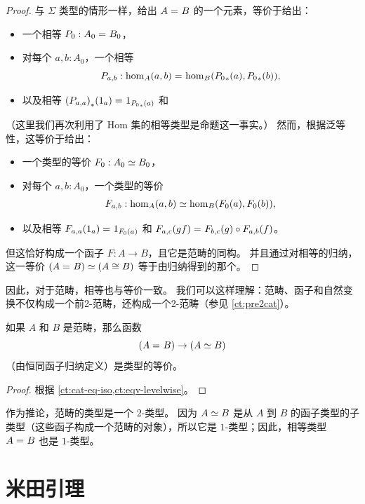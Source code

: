 \begin{proof}
  与 $\Sigma$ 类型的情形一样，给出 $A =_{} B$ 的一个元素，等价于给出：
  \begin{itemize}
  \item 一个相等 $P_0:A_0 =_{} B_0$，
  \item 对每个 $a,b:A_0$，一个相等
    \[P_{a,b}:\hom_A(a,b) =_{} \hom_B({P_0}_{*}\mathopen{}\left({a}\right)\mathclose{},{P_0}_{*}\mathopen{}\left({b}\right)\mathclose{}),\]
  \item 以及相等 ${(P_{a,a})}_{*}\mathopen{}\left({1_a}\right)\mathclose{} =_{} 1_{{P_0}_{*}\mathopen{}\left({a}\right)\mathclose{}}$ 和
  \end{itemize}
  （这里我们再次利用了 Hom 集的相等类型是命题这一事实。）
  然而，根据泛等性，这等价于给出：
  \begin{itemize}
  \item 一个类型的等价 $F_0:A_0 \simeq B_0$，
  \item 对每个 $a,b:A_0$，一个类型的等价
    \[F_{a,b}:\hom_A(a,b) \simeq \hom_B(F_0 (a),F_0 (b)),\]
  \item 以及相等 $F_{a,a}(1_a) =_{} 1_{F_0 (a)}$ 和 $F_{a,c}(gf) =_{} F_{b,c} (g)\circ F_{a,b} (f)$。
  \end{itemize}
  但这恰好构成一个函子 $F:A\to B$，且它是范畴的同构。
  并且通过对相等的归纳，这一等价 $(A =_{} B) \simeq (A\cong B)$ 等于由归纳得到的那个。
\end{proof}

因此，对于范畴，相等也与等价一致。
我们可以这样理解：范畴、函子和自然变换不仅构成一个前2-范畴，还构成一个2-范畴（参见 \cref{ct:pre2cat}）。

\begin{thm}\label{ct:cat-2cat}
  如果 $A$ 和 $B$ 是范畴，那么函数
  \[(A =_{} B) \to (A \simeq B)\]
  （由恒同函子归纳定义）是类型的等价。
\end{thm}

\begin{proof}
  根据 \cref{ct:cat-eq-iso,ct:eqv-levelwise}。
\end{proof}

作为推论，范畴的类型是一个 $2$-类型。
因为 $A \simeq B$ 是从 $A$ 到 $B$ 的函子类型的子类型（这些函子构成一个范畴的对象），所以它是 $1$-类型；因此，相等类型 $A =_{} B$ 也是 $1$-类型。

\section{米田引理}
\label{sec:yoneda}

